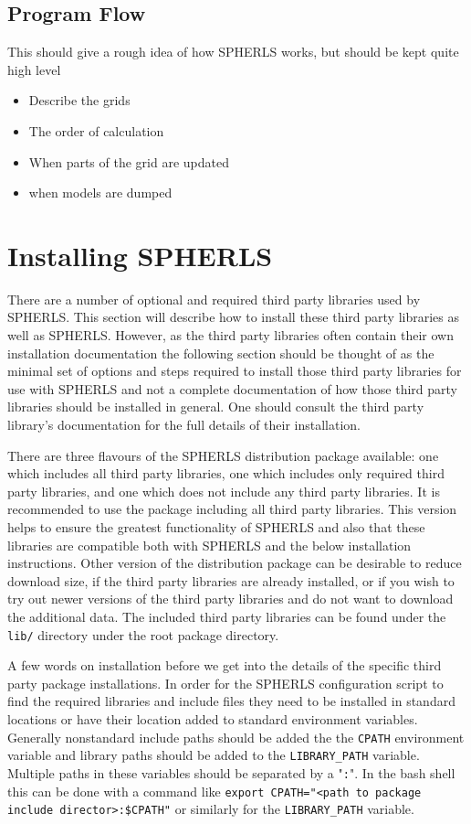 \documentclass[12pt,a4paper]{book}
\begin{document}
\section{Program Flow}
This should give a rough idea of how SPHERLS works, but should be kept quite high level
\begin{itemize}
\item Describe the grids
\item The order of calculation
\item When parts of the grid are updated
\item when models are dumped
\end{itemize}

\chapter{Installing SPHERLS}

There are a number of optional and required third party libraries used by SPHERLS. This section will describe how to install these third party libraries as well as SPHERLS. However, as the third party libraries often contain their own installation documentation the following section should be thought of as the minimal set of options and steps required to install those third party libraries for use with SPHERLS and not a complete documentation of how those third party libraries should be installed in general. One should consult the third party library's documentation for the full details of their installation.

There are three flavours of the SPHERLS distribution package available: one which includes all third party libraries, one which includes only required third party libraries, and one which does not include any third party libraries. It is recommended to use the package including all third party libraries. This version helps to ensure the greatest functionality of SPHERLS and also that these libraries are compatible both with SPHERLS and the below installation instructions. Other version of the distribution package can be desirable to reduce download size, if the third party libraries are already installed, or if you wish to try out newer versions of the third party libraries and do not want to download the additional data. The included third party libraries can be found under the {\tt lib/} directory under the root package directory.

A few words on installation before we get into the details of the specific third party package installations. In order for the SPHERLS configuration script to find the required libraries and include files they need to be installed in standard locations or have their location added to standard environment variables. Generally nonstandard include paths should be added the the {\tt CPATH} environment variable and library paths should be added to the {\tt LIBRARY\_PATH} variable. Multiple paths in these variables should be separated by a "{\tt :}". In the bash shell this can be done with a command like {\tt export CPATH="<path to package include director>:\$CPATH"} or similarly for the {\tt LIBRARY\_PATH} variable.
\end{document}
